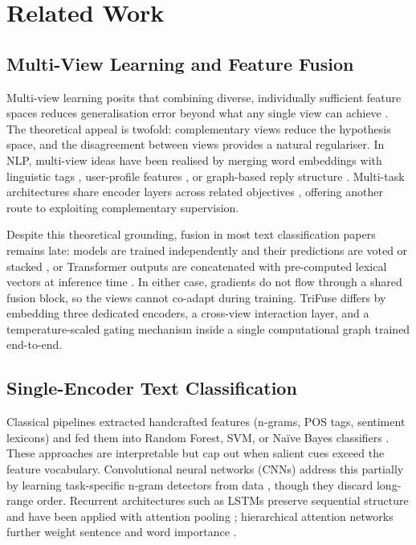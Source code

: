 \documentclass[10pt,twocolumn,a4paper]{article}
\begin{document}
\section{Related Work}\label{sec:related}

\subsection{Multi-View Learning and Feature Fusion}\label{subsec:multiview}

Multi-view learning posits that combining diverse, individually sufficient feature spaces reduces generalisation error beyond what any single view can achieve \citep{ref19}. The theoretical appeal is twofold: complementary views reduce the hypothesis space, and the disagreement between views provides a natural regulariser. In NLP, multi-view ideas have been realised by merging word embeddings with linguistic tags \citep{ref21}, user-profile features \citep{ref22}, or graph-based reply structure \citep{ref17}. Multi-task architectures share encoder layers across related objectives \citep{ref20}, offering another route to exploiting complementary supervision.

Despite this theoretical grounding, fusion in most text classification papers remains late: models are trained independently and their predictions are voted or stacked \citep{ref14,ref36}, or Transformer outputs are concatenated with pre-computed lexical vectors at inference time \citep{ref15,ref16,ref33}. In either case, gradients do not flow through a shared fusion block, so the views cannot co-adapt during training. TriFuse differs by embedding three dedicated encoders, a cross-view interaction layer, and a temperature-scaled gating mechanism inside a single computational graph trained end-to-end.

\subsection{Single-Encoder Text Classification}\label{subsec:single_encoder}

Classical pipelines extracted handcrafted features (n-grams, POS tags, sentiment lexicons) and fed them into Random Forest, SVM, or Na\"ive Bayes classifiers \citep{ref2,ref5,ref6,ref18,ref31}. These approaches are interpretable but cap out when salient cues exceed the feature vocabulary. Convolutional neural networks (CNNs) address this partially by learning task-specific n-gram detectors from data \citep{ref7,ref26}, though they discard long-range order. Recurrent architectures such as LSTMs preserve sequential structure and have been applied with attention pooling \citep{ref8,ref13,ref32}; hierarchical attention networks further weight sentence and word importance \citep{ref30}.
\end{document}
